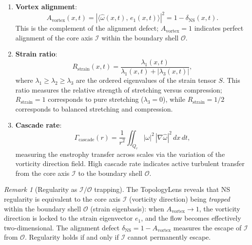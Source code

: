 \documentclass[11pt]{article}
\theoremstyle{definition}
\theoremstyle{remark}
\newtheorem{remark}[theorem]{Remark}
\begin{document}
\begin{enumerate}[nosep]
  \item \textbf{Vortex alignment}:
    \begin{equation}\label{eq:vortex-alignment}
      A_{\mathrm{vortex}}(x,t) = |\langle \hat\omega(x,t),\, e_1(x,t)\rangle|^2
      = 1 - \delta_{\mathrm{NS}}(x,t).
    \end{equation}
    This is the complement of the alignment defect; $A_{\mathrm{vortex}} = 1$
    indicates perfect alignment of the core axis $\mathcal{I}$ within the
    boundary shell $\mathcal{O}$.

  \item \textbf{Strain ratio}:
    \begin{equation}\label{eq:strain-ratio}
      R_{\mathrm{strain}}(x,t) = \frac{\lambda_1(x,t)}{\lambda_1(x,t) + |\lambda_3(x,t)|},
    \end{equation}
    where $\lambda_1 \geq \lambda_2 \geq \lambda_3$ are the ordered eigenvalues
    of the strain tensor $S$.  This ratio measures the relative strength of
    stretching versus compression; $R_{\mathrm{strain}} = 1$ corresponds to
    pure stretching ($\lambda_3 = 0$), while $R_{\mathrm{strain}} = 1/2$ corresponds
    to balanced stretching and compression.

  \item \textbf{Cascade rate}:
    \begin{equation}\label{eq:cascade-rate}
      \Gamma_{\mathrm{cascade}}(r) = \frac{1}{r^2}\iint_{Q_r} |\omega|^2\,
      |\nabla \hat\omega|^2\, dx\, dt,
    \end{equation}
    measuring the enstrophy transfer across scales via the variation of
    the vorticity direction field.  High cascade rate indicates active
    turbulent transfer from the core axis $\mathcal{I}$ to the boundary
    shell $\mathcal{O}$.
\end{enumerate}

\begin{remark}[Regularity as $\mathcal{I}/\mathcal{O}$ trapping]
The TopologyLens reveals that NS regularity is equivalent to the core axis
$\mathcal{I}$ (vorticity direction) being \emph{trapped} within the boundary
shell $\mathcal{O}$ (strain eigenbasis): when $A_{\mathrm{vortex}} \to 1$,
the vorticity direction is locked to the strain eigenvector $e_1$, and the
flow becomes effectively two-dimensional.  The alignment defect
$\delta_{\mathrm{NS}} = 1 - A_{\mathrm{vortex}}$ measures the escape of
$\mathcal{I}$ from $\mathcal{O}$.  Regularity holds if and only if
$\mathcal{I}$ cannot permanently escape.
\end{remark}
\end{document}
